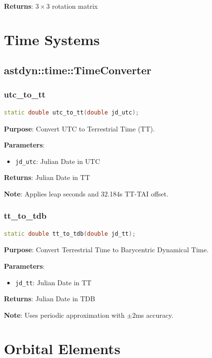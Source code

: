 \textbf{Returns}: $3 \times 3$ rotation matrix

\section{Time Systems}

\subsection{astdyn::time::TimeConverter}

\subsubsection{utc\_to\_tt}

\begin{lstlisting}[language=C++]
static double utc_to_tt(double jd_utc);
\end{lstlisting}

\textbf{Purpose}: Convert UTC to Terrestrial Time (TT).

\textbf{Parameters}:
\begin{itemize}
    \item \texttt{jd\_utc}: Julian Date in UTC
\end{itemize}

\textbf{Returns}: Julian Date in TT

\textbf{Note}: Applies leap seconds and 32.184s TT-TAI offset.

\subsubsection{tt\_to\_tdb}

\begin{lstlisting}[language=C++]
static double tt_to_tdb(double jd_tt);
\end{lstlisting}

\textbf{Purpose}: Convert Terrestrial Time to Barycentric Dynamical Time.

\textbf{Parameters}:
\begin{itemize}
    \item \texttt{jd\_tt}: Julian Date in TT
\end{itemize}

\textbf{Returns}: Julian Date in TDB

\textbf{Note}: Uses periodic approximation with $\pm 2$ms accuracy.

\section{Orbital Elements}

